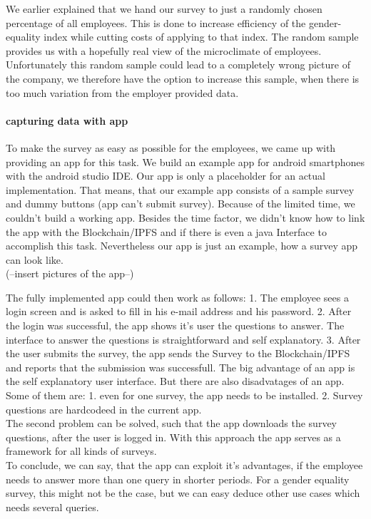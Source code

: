 We earlier explained that we hand our survey to just a randomly chosen percentage of all employees. This is done to increase efficiency of the gender-equality index while cutting costs of applying to that index. The random sample provides us with a hopefully real view of the microclimate of employees. Unfortunately this random sample could lead to a completely wrong picture of the company, we therefore have the option to increase this sample, when there is too much variation from the employer provided data.\\

\paragraph*{capturing data with app}
To make the survey as easy as possible for the employees, we came up with providing an app for this task. We build an example app for android smartphones with the android studio IDE.
Our app is only a placeholder for an actual implementation. That means, that our example app consists of a sample survey and dummy buttons (app can't submit survey).
Because of the limited time, we couldn't build a working app. Besides the time factor, we didn't know how to link the app with the Blockchain/IPFS and if there is even a java Interface to accomplish this task. 
Nevertheless our app is just an example, how a survey app can look like.\\

(--insert pictures of the app--)

The fully implemented app could then work as follows: 1. The employee sees a login screen and is asked to fill in his e-mail address and his password.
2. After the login was successful, the app shows it's user the questions to answer. The interface to answer the questions is straightforward and self explanatory. 
3. After the user submits the survey, the app sends the Survey to the Blockchain/IPFS and reports that the submission was successfull. 
The big advantage of an app is the self explanatory user interface. But there are also disadvatages of an app. Some of them are: 1. even for one survey, the app needs to be installed. 2. Survey questions are hardcodeed in the current app. \\
The second problem can be solved, such that the app downloads the survey questions, after the user is logged in. With this approach the app serves as a framework for all kinds of surveys. \\
To conclude, we can say, that the app can exploit it's advantages, if the employee needs to answer more than one query in shorter periods. For a gender equality survey, this might not be the case, but we can easy deduce other use cases which needs several queries.\\


